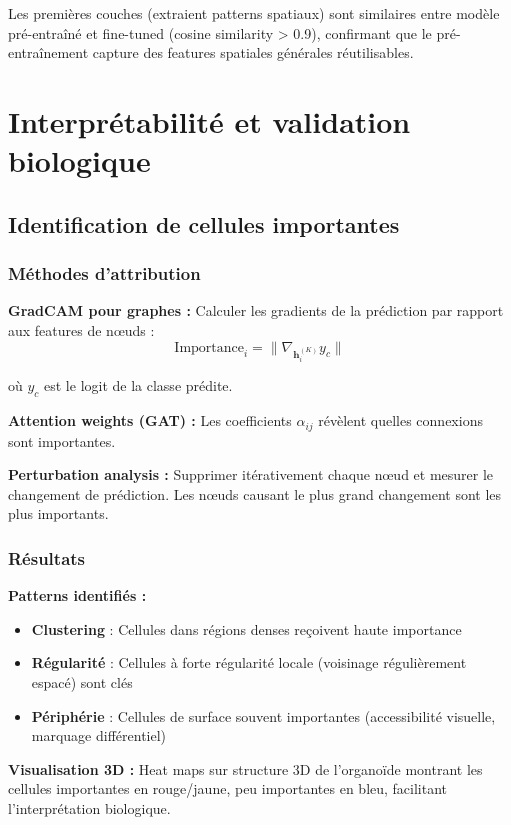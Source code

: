 Les premières couches (extraient patterns spatiaux) sont similaires entre modèle pré-entraîné et fine-tuned (cosine similarity > 0.9), confirmant que le pré-entraînement capture des features spatiales générales réutilisables.

\section{Interprétabilité et validation biologique}

\subsection{Identification de cellules importantes}

\subsubsection{Méthodes d'attribution}

\textbf{GradCAM pour graphes :}
Calculer les gradients de la prédiction par rapport aux features de nœuds :
\[
\text{Importance}_i = \|\nabla_{\mathbf{h}_i^{(K)}} y_c\|
\]

où $y_c$ est le logit de la classe prédite.

\textbf{Attention weights (GAT) :}
Les coefficients $\alpha_{ij}$ révèlent quelles connexions sont importantes.

\textbf{Perturbation analysis :}
Supprimer itérativement chaque nœud et mesurer le changement de prédiction. Les nœuds causant le plus grand changement sont les plus importants.

\subsubsection{Résultats}

\textbf{Patterns identifiés :}
\begin{itemize}
    \item \textbf{Clustering} : Cellules dans régions denses reçoivent haute importance
    \item \textbf{Régularité} : Cellules à forte régularité locale (voisinage régulièrement espacé) sont clés
    \item \textbf{Périphérie} : Cellules de surface souvent importantes (accessibilité visuelle, marquage différentiel)
\end{itemize}

\textbf{Visualisation 3D :}
Heat maps sur structure 3D de l'organoïde montrant les cellules importantes en rouge/jaune, peu importantes en bleu, facilitant l'interprétation biologique.

